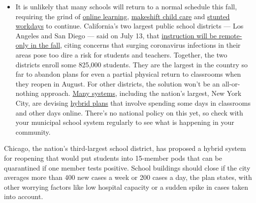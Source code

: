 \begin{itemize}
  \begin{itemize}
  \tightlist
  \item
    It is unlikely that many schools will return to a normal schedule
    this fall, requiring the grind of
    \href{https://www.nytimes.com/2020/06/05/us/coronavirus-education-lost-learning.html?action=click\&pgtype=Article\&state=default\&region=MAIN_CONTENT_3\&context=storylines_faq}{online
    learning},
    \href{https://www.nytimes.com/2020/05/29/us/coronavirus-child-care-centers.html?action=click\&pgtype=Article\&state=default\&region=MAIN_CONTENT_3\&context=storylines_faq}{makeshift
    child care} and
    \href{https://www.nytimes.com/2020/06/03/business/economy/coronavirus-working-women.html?action=click\&pgtype=Article\&state=default\&region=MAIN_CONTENT_3\&context=storylines_faq}{stunted
    workdays} to continue. California's two largest public school
    districts --- Los Angeles and San Diego --- said on July 13, that
    \href{https://www.nytimes.com/2020/07/13/us/lausd-san-diego-school-reopening.html?action=click\&pgtype=Article\&state=default\&region=MAIN_CONTENT_3\&context=storylines_faq}{instruction
    will be remote-only in the fall}, citing concerns that surging
    coronavirus infections in their areas pose too dire a risk for
    students and teachers. Together, the two districts enroll some
    825,000 students. They are the largest in the country so far to
    abandon plans for even a partial physical return to classrooms when
    they reopen in August. For other districts, the solution won't be an
    all-or-nothing approach.
    \href{https://bioethics.jhu.edu/research-and-outreach/projects/eschool-initiative/school-policy-tracker/}{Many
    systems}, including the nation's largest, New York City, are
    devising
    \href{https://www.nytimes.com/2020/06/26/us/coronavirus-schools-reopen-fall.html?action=click\&pgtype=Article\&state=default\&region=MAIN_CONTENT_3\&context=storylines_faq}{hybrid
    plans} that involve spending some days in classrooms and other days
    online. There's no national policy on this yet, so check with your
    municipal school system regularly to see what is happening in your
    community.
  \end{itemize}
\end{itemize}

Chicago, the nation's third-largest school district, has proposed a
hybrid system for reopening that would put students into 15-member pods
that can be quarantined if one member tests positive. School buildings
should close if the city averages more than 400 new cases a week or 200
cases a day, the plan states, with other worrying factors like low
hospital capacity or a sudden spike in cases taken into account.

